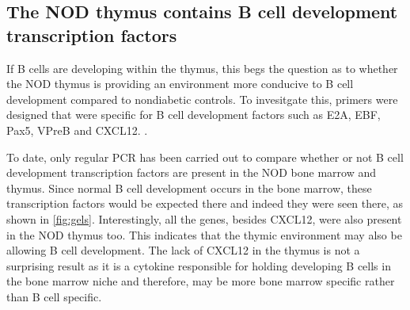 \subsection{The NOD thymus contains B cell development transcription factors}

If B cells are developing within the thymus, this begs the question as to whether the NOD thymus is providing an environment more conducive to B cell development compared to nondiabetic controls. 
To invesitgate this, primers were designed that were specific for B cell development factors such as E2A, EBF, Pax5, VPreB and CXCL12.
.

To date, only regular PCR has been carried out to compare whether or not B cell development transcription factors are present in the NOD bone marrow and thymus.
Since normal B cell development occurs in the bone marrow, these transcription factors would be expected there and indeed they were seen there, as shown in \cref{fig:gels}. 
Interestingly, all the genes, besides CXCL12, were also present in the NOD thymus too.
This indicates that the thymic environment may also be allowing B cell development.
The lack of CXCL12 in the thymus is not a surprising result as it is a cytokine responsible for holding developing B cells in the bone marrow niche and therefore, may be more bone marrow specific rather than B cell specific.

